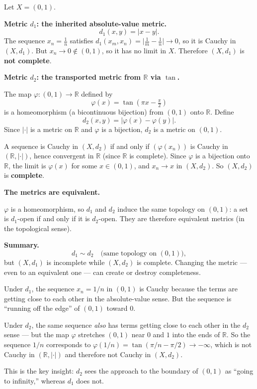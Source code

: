 \begin{example}
\label{ex:completeness-metric-dependent}
Let $X = (0,1)$.

\medskip
\noindent\textbf{Metric $d_1$: the inherited absolute-value metric.}
\[
d_1(x,y) = |x - y|.
\]
The sequence $x_n = \tfrac{1}{n}$ satisfies $d_1(x_m, x_n) = \bigl|\tfrac{1}{m} - \tfrac{1}{n}\bigr| \to 0$,
so it is Cauchy in $(X, d_1)$.
But $x_n \to 0 \notin (0,1)$, so it has no limit in $X$.
Therefore $(X, d_1)$ is \textbf{not complete}.

\medskip
\noindent\textbf{Metric $d_2$: the transported metric from $\mathbb{R}$ via $\tan$.}

The map $\varphi : (0,1) \to \mathbb{R}$ defined by
\[
\varphi(x) = \tan\!\left(\pi x - \tfrac{\pi}{2}\right)
\]
is a homeomorphism (a bicontinuous bijection) from $(0,1)$ onto $\mathbb{R}$.
Define
\[
d_2(x, y) = |\varphi(x) - \varphi(y)|.
\]
Since $|\cdot|$ is a metric on $\mathbb{R}$ and $\varphi$ is a bijection,
$d_2$ is a metric on $(0,1)$.

\medskip
A sequence is Cauchy in $(X, d_2)$ if and only if $(\varphi(x_n))$ is Cauchy in
$(\mathbb{R}, |\cdot|)$, hence convergent in $\mathbb{R}$ (since $\mathbb{R}$ is complete).
Since $\varphi$ is a bijection onto $\mathbb{R}$, the limit is $\varphi(x)$ for some
$x \in (0,1)$, and $x_n \to x$ in $(X, d_2)$.
So $(X, d_2)$ is \textbf{complete}.

\medskip
\noindent\textbf{The metrics are equivalent.}

$\varphi$ is a homeomorphism, so $d_1$ and $d_2$ induce the same topology on $(0,1)$:
a set is $d_1$-open if and only if it is $d_2$-open.
They are therefore equivalent metrics (in the topological sense).

\medskip
\noindent\textbf{Summary.}
\[
d_1 \sim d_2
\quad\text{(same topology on } (0,1)\text{)},
\]
but $(X, d_1)$ is incomplete while $(X, d_2)$ is complete.
Changing the metric --- even to an equivalent one --- can create or
destroy completeness.
\end{example}

\begin{remark*}
Under $d_1$, the sequence $x_n = 1/n$ in $(0,1)$ is Cauchy because the
terms are getting close to each other in the absolute-value sense.
But the sequence is ``running off the edge'' of $(0,1)$ toward $0$.

Under $d_2$, the same sequence \emph{also} has terms getting close to each other
in the $d_2$ sense --- but the map $\varphi$ stretches $(0,1)$ near $0$ and $1$
into the ends of $\mathbb{R}$.
So the sequence $1/n$ corresponds to $\varphi(1/n) = \tan(\pi/n - \pi/2) \to -\infty$,
which is not Cauchy in $(\mathbb{R}, |\cdot|)$ and therefore not Cauchy in $(X, d_2)$.

This is the key insight: $d_2$ sees the approach to the boundary of $(0,1)$
as ``going to infinity,'' whereas $d_1$ does not.
\end{remark*}

